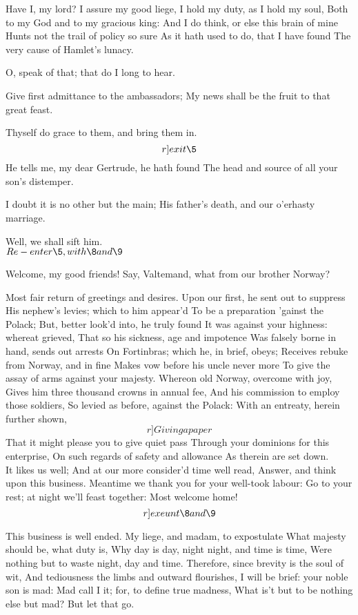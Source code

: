 \documentclass[11pt]{book}
\begin{document}
\5	Have I, my lord? I assure my good liege,
	I hold my duty, as I hold my soul,
	Both to my God and to my gracious king:
	And I do think, or else this brain of mine
	Hunts not the trail of policy so sure
	As it hath used to do, that I have found
	The very cause of Hamlet's lunacy.

\2	O, speak of that; that do I long to hear.

\5	Give first admittance to the ambassadors;
	My news shall be the fruit to that great feast.

\2	Thyself do grace to them, and bring them in. \[r]exit \5\]
	He tells me, my dear Gertrude, he hath found
	The head and source of all your son's distemper.

\3	I doubt it is no other but the main;
	His father's death, and our o'erhasty marriage.

\2	Well, we shall sift him.\\


	\(Re-enter \5, with \8 and \9\)

		   Welcome, my good friends!
	Say, Valtemand, what from our brother Norway?

\8	Most fair return of greetings and desires.
	Upon our first, he sent out to suppress
	His nephew's levies; which to him appear'd
	To be a preparation 'gainst the Polack;
	But, better look'd into, he truly found
	It was against your highness: whereat grieved,
	That so his sickness, age and impotence
	Was falsely borne in hand, sends out arrests
	On Fortinbras; which he, in brief, obeys;
	Receives rebuke from Norway, and in fine
	Makes vow before his uncle never more
	To give the assay of arms against your majesty.
	Whereon old Norway, overcome with joy,
	Gives him three thousand crowns in annual fee,
	And his commission to employ those soldiers,
	So levied as before, against the Polack:
	With an entreaty, herein further shown,
	\[r]Giving a paper\]
	That it might please you to give quiet pass
	Through your dominions for this enterprise,
	On such regards of safety and allowance
	As therein are set down.\\

\2	It likes us well;
	And at our more consider'd time well read,
	Answer, and think upon this business.
	Meantime we thank you for your well-took labour:
	Go to your rest; at night we'll feast together:
	Most welcome home!\\  	\[r]exeunt \8 and \9\]

\5	                  This business is well ended.
	My liege, and madam, to expostulate
	What majesty should be, what duty is,
	Why day is day, night night, and time is time,
	Were nothing but to waste night, day and time.
	Therefore, since brevity is the soul of wit,
	And tediousness the limbs and outward flourishes,
	I will be brief: your noble son is mad:
	Mad call I it; for, to define true madness,
	What is't but to be nothing else but mad?
	But let that go.\\
\end{document}
